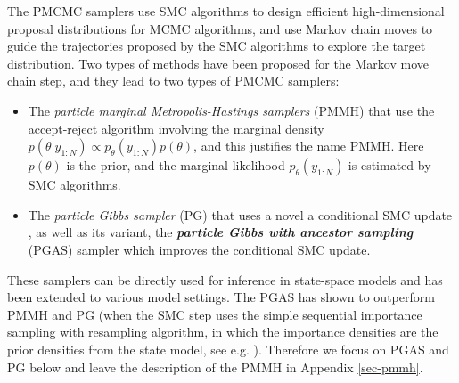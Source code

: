 \documentclass[12pt]{article}
\begin{document}
 The PMCMC samplers use SMC algorithms to design efficient high-dimensional proposal distributions for MCMC algorithms, and use Markov chain moves to guide the trajectories proposed by the SMC algorithms to explore the target distribution. Two types of methods have been proposed for the Markov move chain step, and they lead to two types of PMCMC samplers: 
 \begin{itemize}
 \item The \emph{particle marginal Metropolis-Hastings samplers} (PMMH) that use the accept-reject algorithm involving the marginal density $p(\theta| y_{1:N}) \propto p_\theta(y_{1:N}) p(\theta)$, and this justifies the name PMMH. Here $p(\theta)$ is  the prior, and the marginal likelihood $p_\theta(y_{1:N})$ is estimated by SMC algorithms. 
  \item The \emph{particle Gibbs sampler} (PG) that uses a novel a conditional SMC update \cite{andrieu2010particle}, as well as its variant, the \emph{\textbf{particle Gibbs with ancestor sampling}} (PGAS) sampler \cite{lindsten2014particle} which improves the conditional SMC update. 
 \end{itemize}
 
These samplers can be directly used for inference in state-space models and has been extended to various model settings. The PGAS has shown to outperform PMMH and PG (when the SMC step uses the simple sequential importance sampling with resampling algorithm, in which the importance densities are the prior densities from the state model, see e.g. \cite{andrieu2010particle,lindsten2014particle}). Therefore we focus on PGAS and PG below and leave the description of the PMMH in Appendix \ref{sec-pmmh}. 
\end{document}
